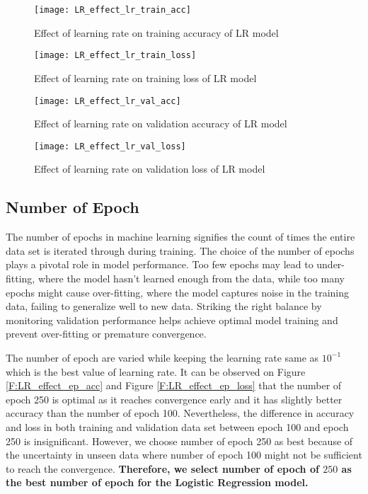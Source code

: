 \documentclass[12pt, a4paper, twoside]{article}
\begin{document}
\begin{figure}[h!]
\centering
\texttt{[image: LR\_effect\_lr\_train\_acc]}
\caption{Effect of learning rate on training accuracy of LR model}
\label{F:LR_effect_lr_train_acc}
\end{figure}
\begin{figure}[h!]
\centering
\texttt{[image: LR\_effect\_lr\_train\_loss]}
\caption{Effect of learning rate on training loss of LR model}
\label{F:LR_effect_lr_train_loss}
\end{figure}
\begin{figure}[h!]
\centering
\texttt{[image: LR\_effect\_lr\_val\_acc]}
\caption{Effect of learning rate on validation accuracy of LR model}
\label{F:LR_effect_lr_val_acc}
\end{figure}
\begin{figure}[h!]
\centering
\texttt{[image: LR\_effect\_lr\_val\_loss]}
\caption{Effect of learning rate on validation loss of LR model}
\label{F:LR_effect_lr_val_loss}
\end{figure}

\subsection{Number of Epoch}\label{SS:lr-ep}
The number of epochs in machine learning signifies the count of times the entire data set is iterated through during training. The choice of the number of epochs plays a pivotal role in model performance. Too few epochs may lead to under-fitting, where the model hasn't learned enough from the data, while too many epochs might cause over-fitting, where the model captures noise in the training data, failing to generalize well to new data. Striking the right balance by monitoring validation performance helps achieve optimal model training and prevent over-fitting or premature convergence.
\par
The number of epoch are varied while keeping the learning rate same as $10^{-1}$ which is the best value of learning rate. It can be observed on Figure \ref{F:LR_effect_ep_acc} and Figure \ref{F:LR_effect_ep_loss} that the number of epoch 250 is optimal as it reaches convergence early and it has slightly better accuracy than the number of epoch 100. Nevertheless, the difference in accuracy and loss in both training and validation data set between epoch 100 and epoch 250 is insignificant. However, we choose number of epoch 250 as best because of the uncertainty in unseen data where number of epoch 100 might not be sufficient to reach the convergence. \textbf{Therefore, we select number of epoch of $250$ as the best number of epoch for the Logistic Regression model.}
\end{document}

